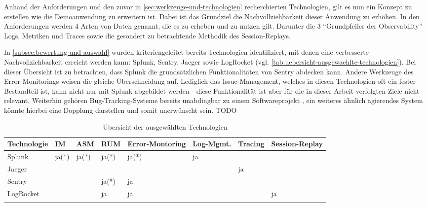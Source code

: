 % 

Anhand der Anforderungen und den zuvor in \autoref{sec:werkzeuge-und-technologien} recherchierten Technologien, gilt es nun ein Konzept zu erstellen wie die Demoanwendung zu erweitern ist. Dabei ist das Grundziel die Nachvollziehbarkeit dieser Anwendung zu erhöhen. In den Anforderungen werden 4 Arten von Daten genannt, die es zu erheben und zu nutzen gilt. Darunter die 3 \enquote{Grundpfeiler der Observability} Logs, Metriken und Traces sowie die gesondert zu betrachtende Methodik des Session-Replays.

In \autoref{subsec:bewertung-und-auswahl} wurden kriteriengeleitet bereits Technologien identifiziert, mit denen eine verbesserte Nachvollziehbarkeit erreicht werden kann: Splunk, Sentry, Jaeger sowie LogRocket (vgl. \autoref{tab:uebersicht-ausgewaehlte-technologien}). Bei dieser Übersicht ist zu betrachten, dass Splunk die grundsätzlichen Funktionalitäten von Sentry abdecken kann. Andere Werkzeuge des Error-Monitorings weisen die gleiche Überschneidung auf. Lediglich das Issue-Management, welches in diesen Technologien oft ein fester Bestandteil ist, kann nicht nur mit Splunk abgebildet werden - diese Funktionalität ist aber für die in dieser Arbeit verfolgten Ziele nicht relevant. Weiterhin gehören Bug-Tracking-Systeme bereits unabdingbar zu einem Softwareprojekt \cite{BugzillaITrackerAndOtherBugTrackers}, ein weiteres ähnlich agierendes System könnte hierbei eine Dopplung darstellen und somit unerwünscht sein. TODO

\begingroup
\centering
\setlength{\LTleft}{-20cm plus -1fill}
\setlength{\LTright}{\LTleft}
\begin{longtable}{|p{4.10cm}|p{0.90cm}|p{0.90cm}|p{1.9cm}|p{1.75cm}|p{1.5cm}|p{1.4cm}|p{1.3cm}|}
\hline
Technologie & IM & ASM & RUM & Error-Montoring & Log-Mgmt. & Tracing & Session-Replay \\
\endhead
Splunk & ja(*) & ja(*) & ja(*) & ja(*) & ja &  &  \\
\hline
Jaeger &  &  &  &  &  & ja &  \\
\hline
Sentry &  &  & ja(*) & ja &  &  &  \\
\hline
LogRocket &  &  & ja & ja &  &  & ja \\
\hline
\caption{Übersicht der ausgewählten Technologien}
\label{tab:uebersicht-ausgewaehlte-technologien}
\end{longtable}
\endgroup

